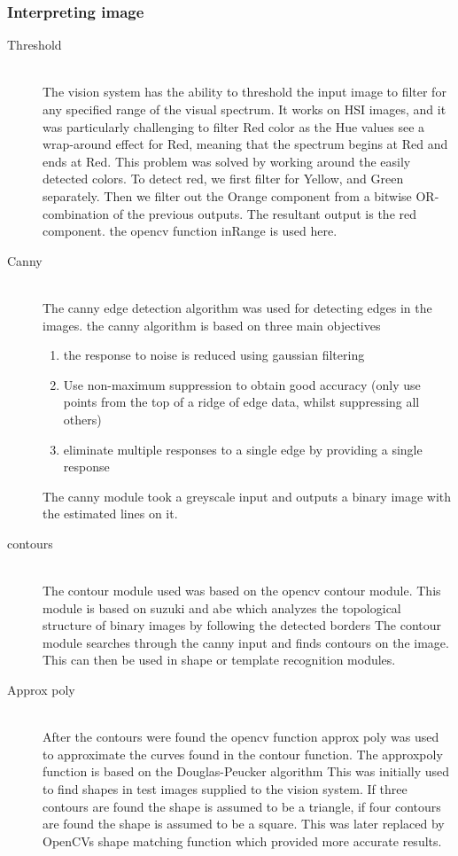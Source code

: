 \subsubsection{Interpreting image} 
\begin{description}
\item[Threshold]\hfill \\

The vision system has the ability to threshold the input image to filter for any specified range of the visual spectrum. 
It works on HSI images, and it was particularly challenging to filter Red color as the Hue values see a wrap-around effect for Red, meaning that the spectrum begins at Red and ends at Red.
This problem was solved by working around the easily detected colors.
To detect red, we first filter for Yellow, and Green separately. Then we filter out the Orange component from a bitwise OR-combination of the previous outputs. The resultant output is the red component.
the opencv function inRange is used here.

\item[Canny]\hfill \\

The canny edge detection algorithm \cite{article:canny}  was used for detecting edges in the images. the canny algorithm is based on three main objectives
\begin{enumerate}
  \item the response to noise is reduced using gaussian filtering
  \item Use non-maximum suppression to obtain good accuracy (only use points from the top of a ridge of edge data, whilst suppressing all others)
  \item eliminate multiple responses to a single edge by providing a single response
\end{enumerate}

The canny module took a greyscale input and outputs a binary image with the estimated lines on it.

\item[contours]\hfill \\
The contour module used was based on the opencv contour module. This module is based on suzuki and abe which analyzes the topological structure of binary
images by following the detected borders \cite{article:suzuki} 
The contour module searches through the canny input and finds contours on the image. This can then be used in shape or template recognition modules.

\item[Approx poly]\hfill \\
After the contours were found the opencv function approx poly was used to approximate the curves found in the contour function. The approxpoly function is based on the Douglas-Peucker algorithm \cite{article:douglas}
This was initially used to find shapes in test images supplied to the vision system. If three contours are found the shape is assumed to be a triangle, if four contours are found the shape is assumed to be a square. This was later replaced by OpenCVs shape matching function which provided more accurate results.


\end{description}
